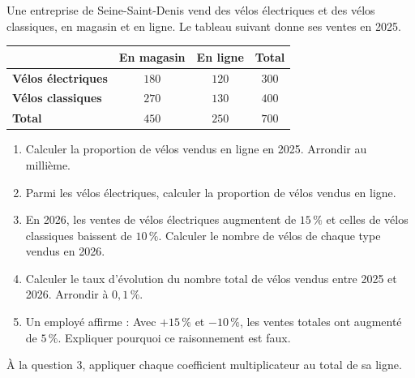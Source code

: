 \documentclass[10pt,a4paper]{article}
\begin{document}
\begin{bloc}
\begin{exo}
Une entreprise de Seine-Saint-Denis vend des vélos électriques et des vélos classiques, en magasin et en ligne. Le tableau suivant donne ses ventes en 2025.

\begin{center}
\renewcommand{\arraystretch}{1.5}
\begin{tabular}{|l|c|c|c|}
    \hline
    & \textbf{En magasin} & \textbf{En ligne} & \textbf{Total} \\
    \hline
    \textbf{Vélos électriques} & \(180\) & \(120\) & \(300\) \\
    \hline
    \textbf{Vélos classiques} & \(270\) & \(130\) & \(400\) \\
    \hline
    \textbf{Total} & \(450\) & \(250\) & \(700\) \\
    \hline
\end{tabular}
\end{center}

\begin{enumerate}[leftmargin=*]
    \item Calculer la proportion de vélos vendus en ligne en 2025. Arrondir au millième.
    \item Parmi les vélos électriques, calculer la proportion de vélos vendus en ligne.
    \item En 2026, les ventes de vélos électriques augmentent de \(15\,\%\) et celles de vélos classiques baissent de \(10\,\%\). Calculer le nombre de vélos de chaque type vendus en 2026.
    \item Calculer le taux d'évolution du nombre total de vélos vendus entre 2025 et 2026. Arrondir à \(0,1\,\%\).
    \item Un employé affirme : \og Avec \(+15\,\%\) et \(-10\,\%\), les ventes totales ont augmenté de \(5\,\%\). \fg{} Expliquer pourquoi ce raisonnement est faux.
\end{enumerate}

\begin{indication}
À la question 3, appliquer chaque coefficient multiplicateur au total de sa ligne.
\end{indication}
\end{exo}
\end{bloc}
\end{document}
